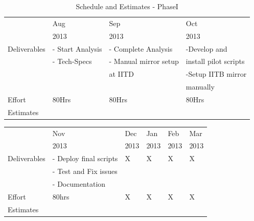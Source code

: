 \documentclass[11pt]{article}
\begin{document}
\begin{table}[H]
\caption{\label{tbl: Schedule and Estimates - PhaseI}Schedule and Estimates - PhaseI}
\begin{center}
\begin{tabular}{llll}
\hline
               &  Aug               &  Sep                    &  Oct                    \\
               &  2013              &  2013                   &  2013                   \\
\hline
 Deliverables  &  - Start Analysis  &  - Complete Analysis    &  -Develop and           \\
               &  - Tech-Specs      &  - Manual mirror setup  &  install pilot scripts  \\
               &                    &  at IITD                &  -Setup IITB mirror     \\
               &                    &                         &  manually               \\
\hline
 Effort        &  80Hrs             &  80Hrs                  &  80Hrs                  \\
 Estimates     &                    &                         &                         \\
\hline
\end{tabular}
\end{center}
\end{table}



\begin{center}
\begin{tabular}{llllll}
\hline
               &  Nov                     &  Dec   &  Jan   &  Feb   &  Mar   \\
               &  2013                    &  2013  &  2013  &  2013  &  2013  \\
\hline
 Deliverables  &  - Deploy final scripts  &  X     &  X     &  X     &  X     \\
               &  - Test and Fix issues   &        &        &        &        \\
               &  - Documentation         &        &        &        &        \\
\hline
 Effort        &  80hrs                   &  X     &  X     &  X     &  X     \\
 Estimates     &                          &        &        &        &        \\
\hline
\end{tabular}
\end{center}
\end{document}
